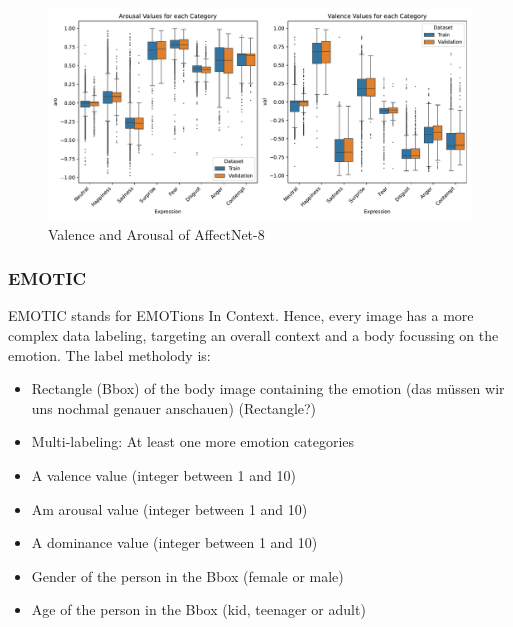 \documentclass[conference]{IEEEtran}
\begin{document}
\begin{figure}[ht]
    \centering
    \includegraphics[width=\columnwidth]{pictures/affectnet/av_for_each_category.pdf}
    \caption{Valence and Arousal of AffectNet-8}
    \label{fig:affectnet_av_for_each_category}
\end{figure}


\subsubsection{EMOTIC}
EMOTIC stands for EMOTions In Context. Hence, every image has a more complex data labeling, targeting an overall context and a body focussing on the emotion. The label metholody is:
\begin{itemize}
    \item Rectangle (Bbox) of the body image containing the emotion (das müssen wir uns nochmal genauer anschauen) (Rectangle?)
    \item Multi-labeling: At least one more emotion categories
    \item A valence value (integer between 1 and 10)
    \item Am arousal value (integer between 1 and 10)
    \item A dominance value (integer between 1 and 10)
    \item Gender of the person in the Bbox (female or male)
    \item Age of the person in the Bbox (kid, teenager or adult)
\end{itemize}
\end{document}

